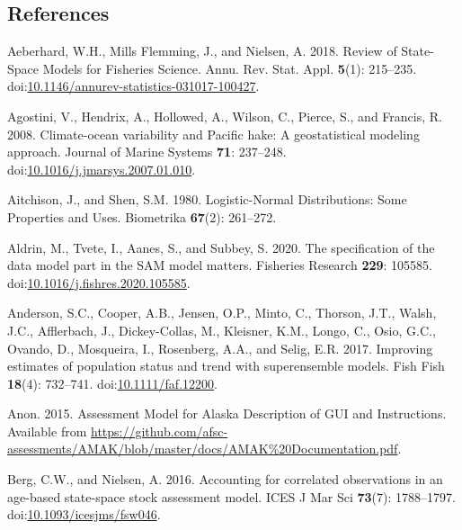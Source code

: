 \documentclass[]{article}
\begin{document}
\pagebreak

\hypertarget{references}{%
\subsection*{References}\label{references}}

\hypertarget{refs}{}
\leavevmode\hypertarget{ref-aeberhard2018Review}{}%
Aeberhard, W.H., Mills Flemming, J., and Nielsen, A. 2018. Review of
State-Space Models for Fisheries Science. Annu. Rev. Stat. Appl.
\textbf{5}(1): 215--235.
doi:\href{https://doi.org/10.1146/annurev-statistics-031017-100427}{10.1146/annurev-statistics-031017-100427}.

\leavevmode\hypertarget{ref-agostini2008Climateocean}{}%
Agostini, V., Hendrix, A., Hollowed, A., Wilson, C., Pierce, S., and
Francis, R. 2008. Climate-ocean variability and Pacific hake: A
geostatistical modeling approach. Journal of Marine Systems \textbf{71}:
237--248.
doi:\href{https://doi.org/10.1016/j.jmarsys.2007.01.010}{10.1016/j.jmarsys.2007.01.010}.

\leavevmode\hypertarget{ref-aitchison1980LogisticNormal}{}%
Aitchison, J., and Shen, S.M. 1980. Logistic-Normal Distributions: Some
Properties and Uses. Biometrika \textbf{67}(2): 261--272.

\leavevmode\hypertarget{ref-aldrin2020Specification}{}%
Aldrin, M., Tvete, I., Aanes, S., and Subbey, S. 2020. The specification
of the data model part in the SAM model matters. Fisheries Research
\textbf{229}: 105585.
doi:\href{https://doi.org/10.1016/j.fishres.2020.105585}{10.1016/j.fishres.2020.105585}.

\leavevmode\hypertarget{ref-anderson2017Improving}{}%
Anderson, S.C., Cooper, A.B., Jensen, O.P., Minto, C., Thorson, J.T.,
Walsh, J.C., Afflerbach, J., Dickey-Collas, M., Kleisner, K.M., Longo,
C., Osio, G.C., Ovando, D., Mosqueira, I., Rosenberg, A.A., and Selig,
E.R. 2017. Improving estimates of population status and trend with
superensemble models. Fish Fish \textbf{18}(4): 732--741.
doi:\href{https://doi.org/10.1111/faf.12200}{10.1111/faf.12200}.

\leavevmode\hypertarget{ref-anon.2015Assessment}{}%
Anon. 2015. Assessment Model for Alaska Description of GUI and
Instructions. Available from
\url{https://github.com/afsc-assessments/AMAK/blob/master/docs/AMAK\%20Documentation.pdf}.

\leavevmode\hypertarget{ref-berg2016Accounting}{}%
Berg, C.W., and Nielsen, A. 2016. Accounting for correlated observations
in an age-based state-space stock assessment model. ICES J Mar Sci
\textbf{73}(7): 1788--1797.
doi:\href{https://doi.org/10.1093/icesjms/fsw046}{10.1093/icesjms/fsw046}.
\end{document}
